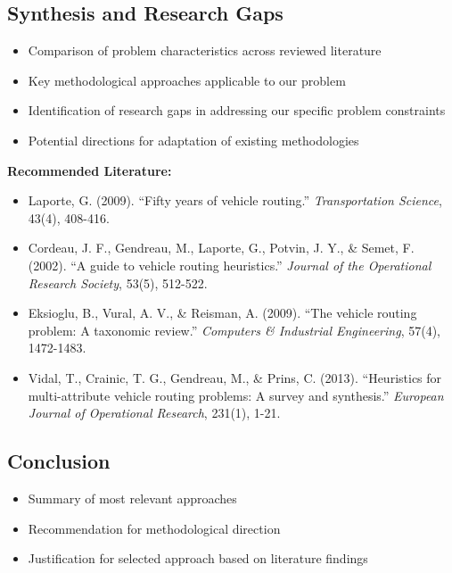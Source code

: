 \subsection{Synthesis and Research Gaps}
\begin{itemize}
    \item Comparison of problem characteristics across reviewed literature
    \item Key methodological approaches applicable to our problem
    \item Identification of research gaps in addressing our specific problem constraints
    \item Potential directions for adaptation of existing methodologies
\end{itemize}

\noindent\textbf{Recommended Literature:}
\begin{itemize}
    \item Laporte, G. (2009). ``Fifty years of vehicle routing.'' \textit{Transportation Science}, 43(4), 408-416.
    \item Cordeau, J. F., Gendreau, M., Laporte, G., Potvin, J. Y., \& Semet, F. (2002). ``A guide to vehicle routing heuristics.'' \textit{Journal of the Operational Research Society}, 53(5), 512-522.
    \item Eksioglu, B., Vural, A. V., \& Reisman, A. (2009). ``The vehicle routing problem: A taxonomic review.'' \textit{Computers \& Industrial Engineering}, 57(4), 1472-1483.
    \item Vidal, T., Crainic, T. G., Gendreau, M., \& Prins, C. (2013). ``Heuristics for multi-attribute vehicle routing problems: A survey and synthesis.'' \textit{European Journal of Operational Research}, 231(1), 1-21.
\end{itemize}

\subsection{Conclusion}
\begin{itemize}
    \item Summary of most relevant approaches
    \item Recommendation for methodological direction
    \item Justification for selected approach based on literature findings
\end{itemize}